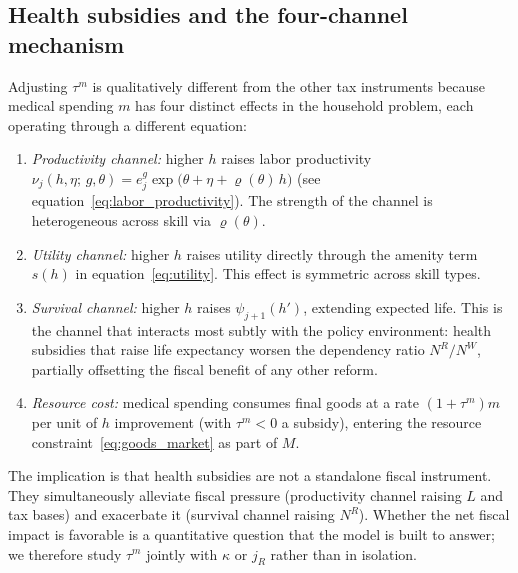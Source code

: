 \documentclass[12pt,a4paper]{article}
\begin{document}
\subsection{Health subsidies and the four-channel mechanism}
\label{subsec:policy_health}

 
Adjusting $\tau^m$ is qualitatively different from the other tax instruments because medical spending $m$ has four distinct effects in the household problem, each operating through a different equation:
 
\begin{enumerate}
\item \emph{Productivity channel:} higher $h$ raises labor productivity $\nu_j(h, \eta;\, g, \theta) = e^g_j \exp\bigl(\theta + \eta + \varrho(\theta)\, h\bigr)$ (see equation~\eqref{eq:labor_productivity}). The strength of the channel is heterogeneous across skill via $\varrho(\theta)$.
\item \emph{Utility channel:} higher $h$ raises utility directly through the amenity term $s(h)$ in equation~\eqref{eq:utility}. This effect is symmetric across skill types.
\item \emph{Survival channel:} higher $h$ raises $\psi_{j+1}(h')$, extending expected life. This is the channel that interacts most subtly with the policy environment: health subsidies that raise life expectancy worsen the dependency ratio $N^R/N^W$, partially offsetting the fiscal benefit of any other reform. 
\item \emph{Resource cost:} medical spending consumes final goods at a rate $(1+\tau^m)m$ per unit of $h$ improvement (with $\tau^m < 0$ a subsidy), entering the resource constraint~\eqref{eq:goods_market} as part of $M$.
\end{enumerate}
 
The implication is that health subsidies are not a standalone fiscal instrument. They simultaneously alleviate fiscal pressure (productivity channel raising $L$ and tax bases) and exacerbate it (survival channel raising $N^R$). Whether the net fiscal impact is favorable is a quantitative question that the model is built to answer; we therefore study $\tau^m$ jointly with $\kappa$ or $j_R$ rather than in isolation.
\end{document}
